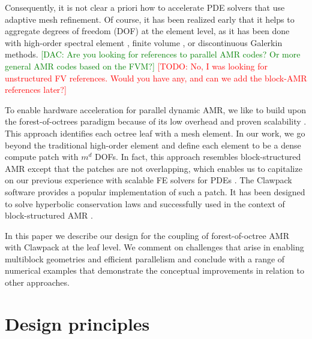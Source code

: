 \documentclass{IOS-Book-Article}     %
\newcommand{\comment}[1]{\textcolor{green}{[DAC: #1]}\xspace}
\newcommand{\todo}[1]{\textcolor{red}{[TODO: #1]}\xspace}
\begin{document}
Consequently, it is not clear a priori how to accelerate PDE solvers
that use adaptive mesh refinement.
Of course, it has been realized early
that it helps to aggregate degrees of freedom (DOF) at the element
level, as it has been done with high-order spectral element
\cite{TufoFischer99}, finite volume
\cite{paramesh, chombo, samrai}, or discontinuous Galerkin
\cite{BursteddeGhattasGurnisEtAl10} methods.
\comment{Are you looking for references to parallel AMR codes?  Or more general AMR codes based on the FVM?}
\todo{No, I was looking for unstructured FV references.  Would you have any,
and can we add the block-AMR references later?}


To enable hardware acceleration for parallel dynamic AMR, we like to
build upon the forest-of-octrees paradigm because of its low overhead
and proven scalability \cite{BursteddeWilcoxGhattas11}.  This approach
identifies each octree leaf with a mesh element.  In our work, we go
beyond the traditional high-order element and define each element to
be a dense compute patch with $m^d$ DOFs.  In fact, this approach
resembles block-structured AMR \cite{be-ol:1984, be-co:1989, be-le:1991,
ColellaGravesKeenEtAl07,Uintah} except that the
patches are not overlapping, which enables us to capitalize on our
previous experience with scalable FE solvers for PDEs
\cite{BursteddeStadlerAlisicEtAl13}.  The Clawpack software
\cite{LeVeque97} provides a popular implementation of such a patch.
It has been designed to solve hyperbolic conservation laws
and successfully used in the context of block-structured AMR
\cite{be-le:1991, amrclaw}.

In this paper we describe our design for the coupling of forest-of-octree AMR
with Clawpack at the leaf level.  We comment on challenges that arise in
enabling multiblock geometries and efficient parallelism and conclude with a range
of numerical examples that demonstrate the conceptual improvements in relation
to other approaches.

\section{Design principles}
\end{document}
